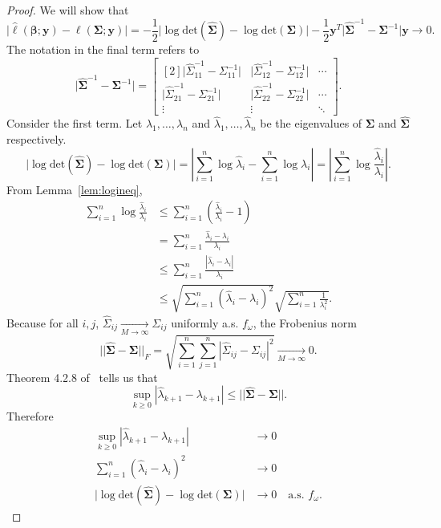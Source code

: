 \documentclass[12pt]{article}
\begin{document}
\begin{proof}

We will show that
\[
\Big|\hat{\ell}(\bm{\beta}; \bm{y}) - \ell(\bm{\Sigma}; \bm{y})\Big| = -\frac{1}{2} \Big| \log \textrm{det}(\widehat{\bm{\Sigma}}) - \log \textrm{det}(\bm{\Sigma}) \Big| - \frac{1}{2} \bm{y}^T \Big| \widehat{\bm{\Sigma}}^{-1} - \bm{\Sigma}^{-1} \Big| \bm{y} \to 0.
\]
The notation in the final term refers to
\[
  \Big| \widehat{\bm{\Sigma}}^{-1} - \bm{\Sigma}^{-1} \Big| =
  \begin{bmatrix}[2]
    \Big| \widehat{\Sigma}^{-1}_{11} - \Sigma^{-1}_{11} \Big| & \Big| \widehat{\Sigma}^{-1}_{12} - \Sigma^{-1}_{12} \Big| & \cdots \\
    \Big| \widehat{\Sigma}^{-1}_{21} - \Sigma^{-1}_{21} \Big| & \Big| \widehat{\Sigma}^{-1}_{22} - \Sigma^{-1}_{22} \Big| & \cdots \\
    \vdots & \vdots & \ddots
  \end{bmatrix}.
\] \label{symb:absmat}
Consider the first term. Let $\lambda_1, \dots, \lambda_n$ and $\hat{\lambda}_1, \dots, \hat{\lambda}_n$ be the eigenvalues of $\bm{\Sigma}$ and $\widehat{\bm{\Sigma}}$ respectively.
\[
  \Big| \log \textrm{det}(\widehat{\bm{\Sigma}}) - \log \textrm{det}(\bm{\Sigma}) \Big| = \left| \sum_{i=1}^n \log \hat{\lambda}_i - \sum_{i=1}^n \log \lambda_i \right| = \left| \sum_{i=1}^n \log \frac{\hat{\lambda}_i}{\lambda_i} \right|.
\]
From Lemma~\ref{lem:logineq},
\begin{align*}
  \sum_{i=1}^n \log \frac{\hat{\lambda}_i}{\lambda_i} &\leq \sum_{i=1}^n \left( \frac{\hat{\lambda}_i}{\lambda_i} - 1 \right) \\
  &= \sum_{i=1}^n \frac{\hat{\lambda}_i - \lambda_i}{\lambda_i} \\
  &\leq \sum_{i=1}^n \frac{|\hat{\lambda}_i - \lambda_i|}{\lambda_i} \\
  &\leq \sqrt{\sum_{i=1}^n (\hat{\lambda}_i - \lambda_i)^2} \sqrt{\sum_{i=1}^n \frac{1}{\lambda_i^2}}. \tag{Cauchy-Schwarz}
\end{align*}
Because for all $i,j$, $\widehat{\Sigma}_{ij} \xrightarrow[M \to \infty]{} \Sigma_{ij}$ uniformly a.s. $f_\omega$, the Frobenius norm 
\[
  ||\widehat{\bm{\Sigma}} - \bm{\Sigma}||_F = \sqrt{\sum_{i=1}^n \sum_{j=1}^n \left| \widehat{\Sigma}_{ij} - \Sigma_{ij} \right|^2} \xrightarrow[M \to \infty]{} 0.
\]
Theorem 4.2.8 of~\cite{hsing2015theoretical} tells us that
\[
  \sup_{k \geq 0} |\hat{\lambda}_{k+1} - \lambda_{k+1}| \leq ||\widehat{\bm{\Sigma}} - \bm{\Sigma}||.
\]
Therefore
\begin{align*}
  \sup_{k \geq 0} |\hat{\lambda}_{k+1} - \lambda_{k+1}| &\to 0 \\
  \sum_{i=1}^n (\hat{\lambda}_i - \lambda_i)^2 &\to 0 \\
  \Big| \log \textrm{det}(\widehat{\bm{\Sigma}}) - \log \textrm{det}(\bm{\Sigma}) \Big| &\to 0 \quad \textrm{a.s. } f_\omega.
\end{align*}


\end{proof}
\end{document}
